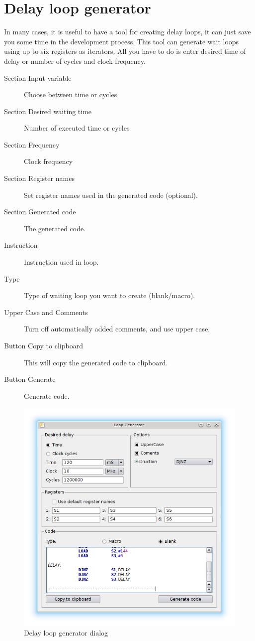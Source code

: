 \clearpage
\section{Delay loop generator}
    In many cases, it is useful to have a tool for creating delay loops, it can just save you some time in the
    development process. This tool can generate wait loops using up to six registers as iterators. All you have to do is
    enter desired time of delay or number of cycles and clock frequency.

    \begin{description}
        \item[Section Input variable] Choose between time or cycles
        \item[Section Desired waiting time] Number of executed time or cycles
        \item[Section Frequency] Clock frequency
        \item[Section Register names] Set register names used in the generated code (optional).
        \item[Section Generated code] The generated code.
        \item[Instruction] Instruction used in loop.
        \item[Type] Type of waiting loop you want to create (blank/macro).
        \item[Upper Case and Comments]  Turn off automatically added comments, and use upper case.
        \item[Button Copy to clipboard] This will copy the generated code to clipboard.
        \item[Button Generate] Generate code.
    \end{description}

    \begin{figure}[h]
        \centering
        \includegraphics[width=.6\textwidth]{img/loop_gen.png}
        \caption{Delay loop generator dialog}
    \end{figure}

